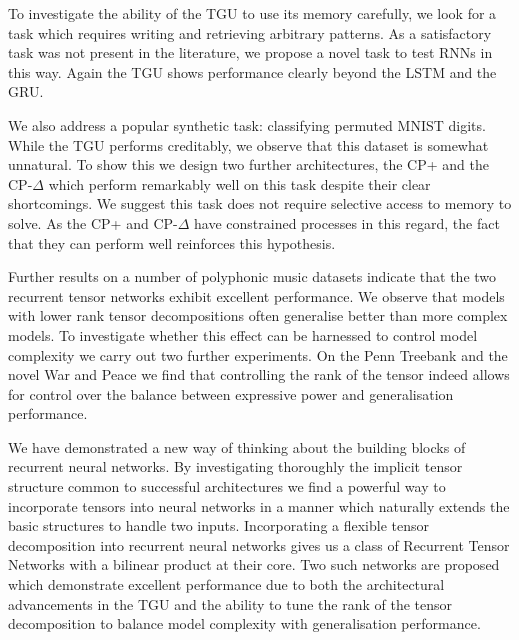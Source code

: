 To investigate the ability of the TGU to use its memory carefully, we look for a task which requires
writing and retrieving arbitrary patterns. As a satisfactory task was
not present in the literature, we propose a novel task to test RNNs in this way. Again the TGU shows
performance clearly beyond the LSTM and the GRU.

We also address a popular synthetic task: classifying permuted MNIST digits. While the TGU performs
creditably, we observe that this dataset is somewhat unnatural. To show this we design two further
architectures, the CP+ and the CP-\(\Delta\) which perform remarkably well on this task despite their
clear shortcomings. We suggest this task does not require selective access to memory to solve. As the
CP+ and CP-\(\Delta\) have constrained processes in this regard, the fact that they can perform well
reinforces this hypothesis.

Further results on a number of polyphonic music
datasets indicate that the two recurrent tensor networks exhibit excellent performance. 
We observe that models with lower rank tensor decompositions often generalise better than more
complex models.
To investigate whether this effect can be harnessed to control model complexity
we carry out two further experiments. On the Penn Treebank and the novel War and Peace we find
that controlling the rank of the tensor indeed allows for control over the balance between expressive
power and generalisation performance.

We have demonstrated a new way of thinking about the building blocks of recurrent neural networks.
By investigating thoroughly the implicit tensor structure common to successful architectures we
find a powerful way to incorporate tensors into neural networks in a manner which naturally
extends the basic structures to handle two inputs. Incorporating a flexible tensor decomposition into
recurrent neural networks gives us a class of Recurrent Tensor Networks with a bilinear product
at their core. Two such networks are proposed which demonstrate excellent performance due to both
the architectural advancements in the TGU and the ability to tune the rank of the tensor decomposition
to balance model complexity with generalisation performance.

